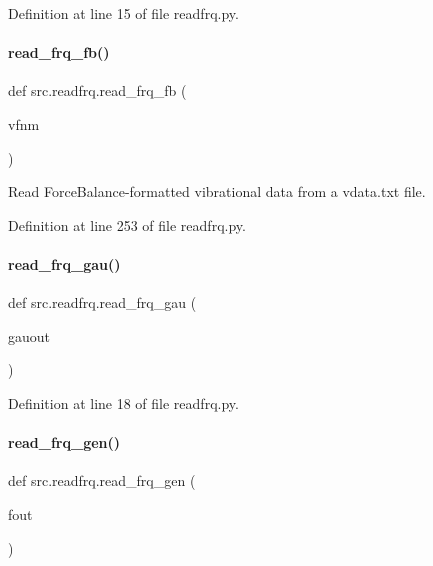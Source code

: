 Definition at line 15 of file readfrq.\+py.

\mbox{\label{namespacesrc_1_1readfrq_a48a1a99942b010b7408fd2de6561701f}} 
\paragraph{\texorpdfstring{read\+\_\+frq\+\_\+fb()}{read\_frq\_fb()}}
{\footnotesize\ttfamily def src.\+readfrq.\+read\+\_\+frq\+\_\+fb (\begin{DoxyParamCaption}\item[{}]{vfnm }\end{DoxyParamCaption})}



Read Force\+Balance-\/formatted vibrational data from a vdata.\+txt file. 



Definition at line 253 of file readfrq.\+py.

\mbox{\label{namespacesrc_1_1readfrq_acea99aa6d0048a5ef5afedb360fb27e3}} 
\paragraph{\texorpdfstring{read\+\_\+frq\+\_\+gau()}{read\_frq\_gau()}}
{\footnotesize\ttfamily def src.\+readfrq.\+read\+\_\+frq\+\_\+gau (\begin{DoxyParamCaption}\item[{}]{gauout }\end{DoxyParamCaption})}



Definition at line 18 of file readfrq.\+py.

\mbox{\label{namespacesrc_1_1readfrq_aa60d506cc40377d6ca6736729b25a8bd}} 
\paragraph{\texorpdfstring{read\+\_\+frq\+\_\+gen()}{read\_frq\_gen()}}
{\footnotesize\ttfamily def src.\+readfrq.\+read\+\_\+frq\+\_\+gen (\begin{DoxyParamCaption}\item[{}]{fout }\end{DoxyParamCaption})}



